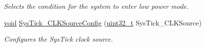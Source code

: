 \begin{DoxyCompactItemize}
\begin{DoxyCompactList}\small\item\em Selects the condition for the system to enter low power mode. \end{DoxyCompactList}\item 
\hyperlink{usb__devapi_8h_afabf60e7f57651d6d595a02c75f07cd0}{void} \hyperlink{group___m_i_s_c___exported___functions_ga2777d255bb06ad62bb6372a9db1ff385}{Sys\+Tick\+\_\+\+C\+L\+K\+Source\+Config} (\hyperlink{_p_e___types_8h_a33594304e786b158f3fb30289278f5af}{uint32\+\_\+t} Sys\+Tick\+\_\+\+C\+L\+K\+Source)
\begin{DoxyCompactList}\small\item\em Configures the Sys\+Tick clock source. \end{DoxyCompactList}\end{DoxyCompactItemize}
